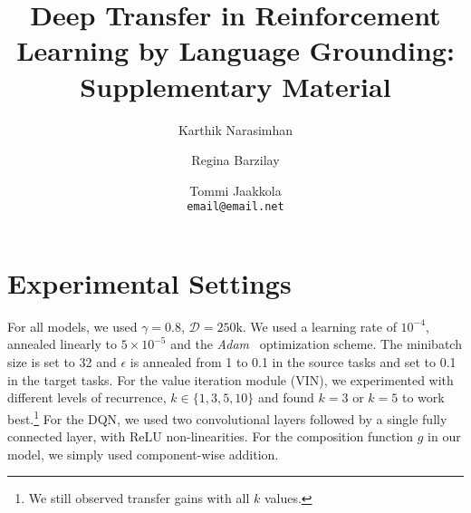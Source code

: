 \documentclass[11pt,letterpaper]{article}
\title{Deep Transfer in Reinforcement Learning by Language Grounding: Supplementary Material}
\author{ Karthik Narasimhan \and Regina Barzilay \and Tommi Jaakkola \\
  {\tt  email@email.net}}
\date{}
\begin{document}
\maketitle

\section{Experimental Settings}
For all models, we used $\gamma = 0.8$, $\mathcal{D} = 250\text{k}$. We used a learning rate of $10^{-4}$, annealed linearly to $5 \times 10^{-5}$ and the \emph{Adam}~\cite{kingma2014adam} optimization scheme. The minibatch size is set to 32 and $\epsilon$ is annealed from 1 to 0.1 in the source tasks and set to 0.1 in the target tasks. For the value iteration module (VIN), we experimented with different levels of recurrence, $k \in \{1,3,5,10\}$ and found $k=3$ or $k=5$ to work best.\footnote{We still observed transfer gains with all $k$ values.} For the DQN, we used two convolutional layers followed by a single fully connected layer, with ReLU non-linearities. For the composition function $g$ in our model, we simply used component-wise addition. 




\end{document}
